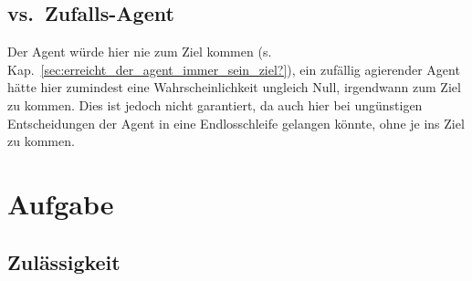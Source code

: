 \documentclass[a4paper,draft=false,oneside,12pt,ngerman]{scrreprt}
\begin{document}
\section{vs.\ Zufalls-Agent}
\label{sec:vs._zufalls-agent}

\begin{center}
\vspace{0.4cm}
\end{center}

Der Agent würde hier nie zum Ziel kommen (s.
Kap.~\ref{sec:erreicht_der_agent_immer_sein_ziel?}), ein zufällig agierender Agent
hätte hier zumindest eine Wahrscheinlichkeit ungleich Null, irgendwann zum Ziel
zu kommen. Dies ist jedoch nicht garantiert, da auch hier bei ungünstigen
Entscheidungen der Agent in eine Endlosschleife gelangen könnte, ohne je ins
Ziel zu kommen.

\chapter{Aufgabe}
\label{chp:aufgabe2}

\section{Zulässigkeit}
\label{sec:zulaessigkeit}
\end{document}
